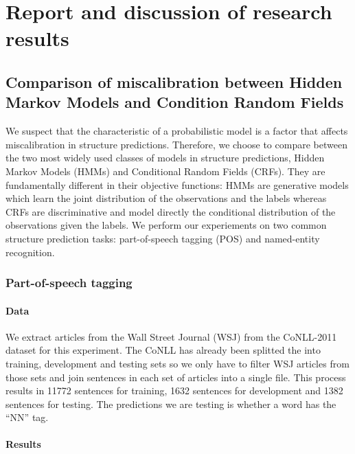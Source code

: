 \chapter{Report and discussion of research results}

\section{Comparison of miscalibration between Hidden Markov Models and Condition Random Fields}

We suspect that the characteristic of a probabilistic model is a factor that affects miscalibration in structure predictions. Therefore, we choose to compare between the two most widely used classes of models in structure predictions, Hidden Markov Models (HMMs) and Conditional Random Fields (CRFs). They are fundamentally different in their objective functions: HMMs are generative models which learn the joint distribution of the observations and the labels whereas CRFs are discriminative and model directly the conditional distribution of the observations given the labels. We perform our experiements on two common structure prediction tasks: part-of-speech tagging (POS) and named-entity recognition. 

\subsection{Part-of-speech tagging}

\subsubsection{Data}

We extract articles from the Wall Street Journal (WSJ) from the CoNLL-2011 dataset for this experiment. The CoNLL has already been splitted the into training, development and testing sets so we only have to filter WSJ articles from those sets and join sentences in each set of articles into a single file. This process results in 11772 sentences for training, 1632 sentences for development and 1382 sentences for testing. The predictions we are testing is whether a word has the ``NN'' tag. 

\subsubsection{Results}

